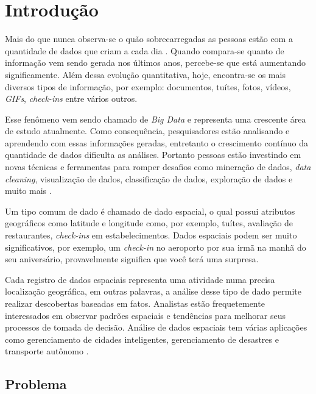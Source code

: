 \chapter{Introdução}
\label{chap:introducao}

Mais do que nunca observa-se o quão sobrecarregadas as pessoas estão com a quantidade de dados que criam a cada dia \cite{Pradeep2017}. Quando compara-se quanto de informação vem sendo gerada nos últimos anos, percebe-se que está aumentando significamente. Além dessa evolução quantitativa, hoje, encontra-se os mais diversos tipos de informação, por exemplo: documentos, tuítes, fotos, vídeos, \textit{GIFs}, \textit{check-ins} entre vários outros.

Esse fenômeno vem sendo chamado de \textit{Big Data} e representa uma crescente área de estudo atualmente. Como consequência, pesquisadores estão analisando e aprendendo com essas informações geradas, entretanto o crescimento contínuo da quantidade de dados dificulta as análises. Portanto pessoas estão investindo em novas técnicas e ferramentas para romper desafios como mineração de dados, {\em data cleaning}, visualização de dados, classificação de dados, exploração de dados e muito mais \cite{Zhang2015}.

Um tipo comum de dado é chamado de dado espacial, o qual  possui atributos geográficos como latitude e longitude como, por exemplo, tuítes, avaliação de restaurantes, {\em check-ins} em estabelecimentos. Dados espaciais podem ser muito significativos, por exemplo, um {\em check-in} no aeroporto por sua irmã na manhã do seu aniversário, provavelmente significa que você terá uma surpresa.

Cada registro de dados espaciais representa uma atividade numa precisa localização geográfica, em outras palavras, a análise desse tipo de dado permite realizar descobertas baseadas em fatos. Analistas estão frequetemente interessados em observar padrões espaciais e tendências para melhorar seus processos de tomada de decisão. Análise de dados espaciais tem várias aplicações como gerenciamento de cidades inteligentes, gerenciamento de desastres e transporte autônomo \cite{RoddickEHPS04,Telang:2012}.

\section{Problema}

